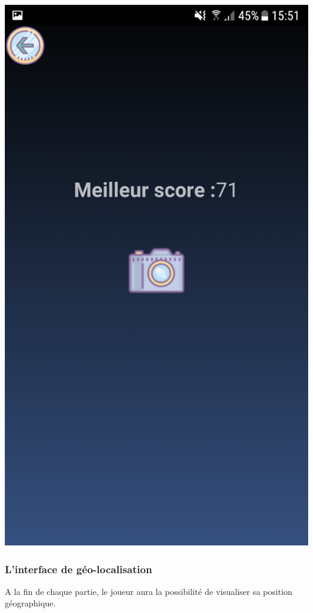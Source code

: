 \documentclass{article}
\begin{document}
\begin{center}
    \includegraphics[scale = 0.18]{images/Android_1.png}
\end{center}

\newpage
\subsubsection{L'interface de géo-localisation}
A la fin de chaque partie, le joueur aura la possibilité de visualiser sa position géographique.
\end{document}
